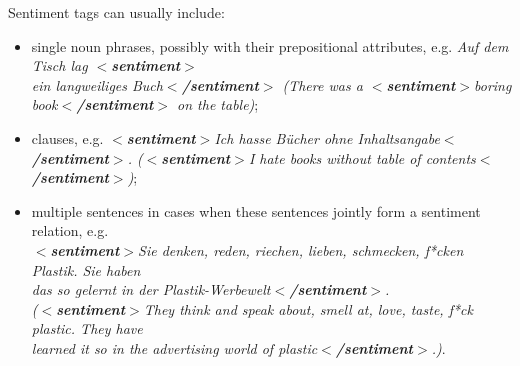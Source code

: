 \documentclass[11pt,a4paper]{article}
\newcommand{\xmltag}[1]{{\textbf{\small$<$#1$>$}}}
\newcommand{\sentiment}[1]{\xmltag{sentiment}#1\xmltag{/sentiment}}
\begin{document}
Sentiment tags can usually include:
\begin{itemize}
\item single noun phrases, possibly with their prepositional
  attributes, e.g. \textit{Auf dem Tisch lag \xmltag{sentiment}\\ ein
    langweiliges Buch\xmltag{/sentiment} (There was a
    \sentiment{boring book} on the table)};
\item clauses, e.g. \textit{\sentiment{Ich hasse B\"ucher ohne
  Inhaltsangabe}. (\sentiment{I hate books without table of
  contents})};
\item multiple sentences in cases when these sentences jointly form a
  sentiment relation, e.g.\\\textit{\sentiment{Sie denken, reden,
      riechen, lieben, schmecken, f*cken Plastik. Sie haben\\das so
      gelernt in der Plastik-Werbewelt}.\\ (\sentiment{They think and
      speak about, smell at, love, taste, f*ck plastic.  They
      have\\ learned it so in the advertising world of plastic}.)}.
\end{itemize}
\end{document}
